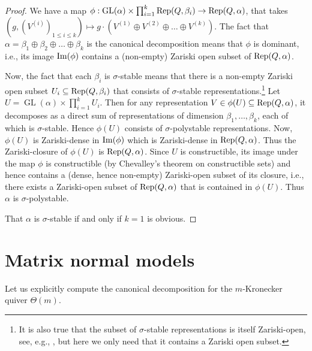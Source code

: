 \documentclass[11pt]{amsart}
\theoremstyle{definition}
\newcommand{\Rep}{{\rm Rep}}
\newcommand{\GL}{\operatorname{GL}}
\begin{document}
\begin{proof}
We have a map $\phi: \GL(\alpha) \times \prod_{i = 1}^k \Rep(Q,\beta_i) \rightarrow \Rep(Q,\alpha)$, that takes $(g, (V^{(i)})_{1 \leq i \leq k}) \mapsto g \cdot (V^{(1)} \oplus V^{(2)}\oplus \dots \oplus V^{(k)})$. The fact that $\alpha = \beta_1 \oplus \beta_2 \oplus \dots \oplus \beta_k$ is the canonical decomposition means that $\phi$ is dominant, i.e., its image ${\rm Im}(\phi)$ contains a (non-empty) Zariski open subset of $\Rep(Q,\alpha)$. 

Now, the fact that each $\beta_i$ is $\sigma$-stable means that there is a non-empty Zariski open subset $U_i \subseteq \Rep(Q,\beta_i)$ that consists of $\sigma$-stable representations.\footnote{It is also true that the subset of $\sigma$-stable representations is itself Zariski-open, see, e.g., \cite[Proposition~3.19]{Hoskins}, but here we only need that it contains a Zariski open subset.} Let $U = \GL(\alpha) \times \prod_{i=1}^k U_i$. Then for any representation $V \in \phi(U) \subseteq \Rep(Q,\alpha)$, it decomposes as a direct sum of representations of dimension $\beta_1, \dots, \beta_k$, each of which is $\sigma$-stable. Hence $\phi(U)$ consists of $\sigma$-polystable representations. Now, $\phi(U)$ is Zariski-dense in ${\rm Im}(\phi)$ which is Zariski-dense in $\Rep(Q,\alpha)$. Thus the Zariski-closure of $\phi(U)$ is $\Rep(Q,\alpha)$. Since $U$ is constructible, its image under the map $\phi$ is constructible (by Chevalley's theorem on constructible sets) and hence contains a (dense, hence non-empty) Zariski-open subset of its closure, i.e., there exists a Zariski-open subset of $\Rep(Q,\alpha)$ that is contained in $\phi(U)$. Thus $\alpha$ is $\sigma$-polystable.

That $\alpha$ is $\sigma$-stable if and only if $k = 1$ is obvious.
\end{proof}









\section{Matrix normal models} \label{sec:mnm}
Let us explicitly compute the canonical decomposition for the $m$-Kronecker quiver $\Theta(m)$.
\end{document}
